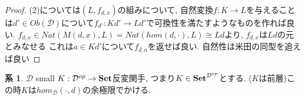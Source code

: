 \documentclass[dvipdfmx,a4paper,11pt]{article}
\theoremstyle{definition}
\newtheorem{cor}[thm]{系}
\begin{document}
\begin{proof}
(2)については$(L, f_{d,x})$の組みについて, 
自然変換$f : K \to L$を与えることは$d' \in Ob(\mathcal{D})$について$f_{d'} : Kd' \to Ld'$で可換性を満たすようなものを作れば良い. $f_{d,x} \in Nat( M(d,x), L)=Nat( hom(d,\cdot), L)\cong Ld$より, $f_{d,x}$は$Ld$の元とみなせる
これは$a \in Kd'$について$f_{d,a}$を返せば良い. 
自然性は米田の同型を追えば良い
\end{proof}

 \begin{tcolorbox}
 [colback = white, colframe = green!35!black, fonttitle = \bfseries,breakable = true]
\begin{cor}
\label{cor-colim-represent}
$\mathcal{D}$ small 
$K : \mathcal{D}^{op} \to {\bf Set}$反変関手, つまり$K \in {\bf Set}^{\mathcal{D}^{op}}$とする. ($K$は前層)この時$K$は$hom_{\mathcal{D}}(\cdot, d)$の余極限でかける. 
\end{cor}
\end{tcolorbox}
\end{document}
